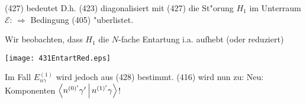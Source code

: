 \documentclass[a4paper]{scrartcl}
\begin{document}
(427) bedeutet
D.h. (423) diagonalisiert mit (427) die St"orung $H_1$ im Unterraum $\mathcal E$:
$\Longrightarrow$ Bedingung (405) "uberlistet.

Wir beobachten, dass $H_1$ die $N$-fache Entartung i.a. aufhebt (oder reduziert)
\begin{center}
\texttt{[image: 431EntartRed.eps]}
\end{center}
Im Fall $E_{n \gamma}^{(1)}$ wird jedoch aus (428) bestimmt. (416) wird nun zu:
Neu: Komponenten $\Braket{ n^{(0)'} \gamma' | n^{(1)'} \gamma}$!
\end{document}
